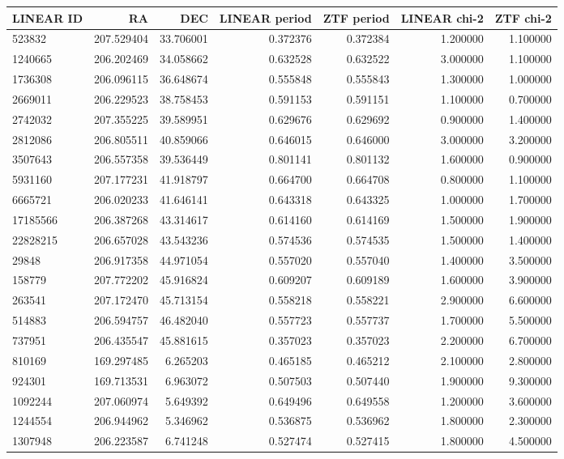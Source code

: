 \begin{tabular}{lrrrrrr}
\toprule
LINEAR ID & RA & DEC & LINEAR period & ZTF period & LINEAR chi-2 & ZTF chi-2 \\
\midrule
523832 & 207.529404 & 33.706001 & 0.372376 & 0.372384 & 1.200000 & 1.100000 \\
1240665 & 206.202469 & 34.058662 & 0.632528 & 0.632522 & 3.000000 & 1.100000 \\
1736308 & 206.096115 & 36.648674 & 0.555848 & 0.555843 & 1.300000 & 1.000000 \\
2669011 & 206.229523 & 38.758453 & 0.591153 & 0.591151 & 1.100000 & 0.700000 \\
2742032 & 207.355225 & 39.589951 & 0.629676 & 0.629692 & 0.900000 & 1.400000 \\
2812086 & 206.805511 & 40.859066 & 0.646015 & 0.646000 & 3.000000 & 3.200000 \\
3507643 & 206.557358 & 39.536449 & 0.801141 & 0.801132 & 1.600000 & 0.900000 \\
5931160 & 207.177231 & 41.918797 & 0.664700 & 0.664708 & 0.800000 & 1.100000 \\
6665721 & 206.020233 & 41.646141 & 0.643318 & 0.643325 & 1.000000 & 1.700000 \\
17185566 & 206.387268 & 43.314617 & 0.614160 & 0.614169 & 1.500000 & 1.900000 \\
22828215 & 206.657028 & 43.543236 & 0.574536 & 0.574535 & 1.500000 & 1.400000 \\
29848 & 206.917358 & 44.971054 & 0.557020 & 0.557040 & 1.400000 & 3.500000 \\
158779 & 207.772202 & 45.916824 & 0.609207 & 0.609189 & 1.600000 & 3.900000 \\
263541 & 207.172470 & 45.713154 & 0.558218 & 0.558221 & 2.900000 & 6.600000 \\
514883 & 206.594757 & 46.482040 & 0.557723 & 0.557737 & 1.700000 & 5.500000 \\
737951 & 206.435547 & 45.881615 & 0.357023 & 0.357023 & 2.200000 & 6.700000 \\
810169 & 169.297485 & 6.265203 & 0.465185 & 0.465212 & 2.100000 & 2.800000 \\
924301 & 169.713531 & 6.963072 & 0.507503 & 0.507440 & 1.900000 & 9.300000 \\
1092244 & 207.060974 & 5.649392 & 0.649496 & 0.649558 & 1.200000 & 3.600000 \\
1244554 & 206.944962 & 5.346962 & 0.536875 & 0.536962 & 1.800000 & 2.300000 \\
1307948 & 206.223587 & 6.741248 & 0.527474 & 0.527415 & 1.800000 & 4.500000 \\

\end{tabular}
